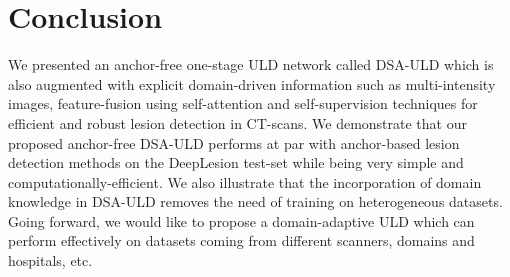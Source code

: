 \documentclass{article}
\begin{document}
\vspace{-4mm}
\section{Conclusion}
\label{sec:conclusion}
\vspace{-2mm}
We presented an anchor-free one-stage ULD network called DSA-ULD which is also augmented with explicit domain-driven information such as multi-intensity images, feature-fusion using self-attention and self-supervision techniques for efficient and robust lesion detection in CT-scans. We demonstrate that our proposed anchor-free DSA-ULD performs at par with anchor-based lesion detection methods on the DeepLesion test-set while being very simple and computationally-efficient. We also illustrate that the incorporation of domain knowledge in DSA-ULD removes the need of training on heterogeneous datasets. Going forward, we would like to propose a domain-adaptive ULD which can perform effectively on datasets coming from different scanners, domains and hospitals, etc.



\vspace{-2mm}
\small{


}
\end{document}
